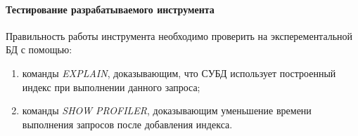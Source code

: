 \paragraph{Тестирование разрабатываемого инструмента} 

Правильность работы инструмента необходимо проверить на эксперементальной БД с помощью:
\begin{enumerate}
\item команды \textit{EXPLAIN}, доказывающим, что СУБД использует построенный индекс при выполнении данного запроса;
\item команды \textit{SHOW PROFILER}, доказывающим уменьшение времени выполнения запросов после добавления индекса.
\end{enumerate}
